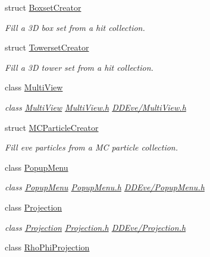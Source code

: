 \begin{DoxyCompactItemize}
struct \hyperlink{struct_d_d4hep_1_1_boxset_creator}{BoxsetCreator}
\begin{DoxyCompactList}\small\item\em Fill a 3D box set from a hit collection. \item\end{DoxyCompactList}\item 
struct \hyperlink{struct_d_d4hep_1_1_towerset_creator}{TowersetCreator}
\begin{DoxyCompactList}\small\item\em Fill a 3D tower set from a hit collection. \item\end{DoxyCompactList}\item 
class \hyperlink{class_d_d4hep_1_1_multi_view}{MultiView}
\begin{DoxyCompactList}\small\item\em class \hyperlink{class_d_d4hep_1_1_multi_view}{MultiView} \hyperlink{_multi_view_8h}{MultiView.h} \hyperlink{_multi_view_8h}{DDEve/MultiView.h} \item\end{DoxyCompactList}\item 
struct \hyperlink{struct_d_d4hep_1_1_m_c_particle_creator}{MCParticleCreator}
\begin{DoxyCompactList}\small\item\em Fill eve particles from a MC particle collection. \item\end{DoxyCompactList}\item 
class \hyperlink{class_d_d4hep_1_1_popup_menu}{PopupMenu}
\begin{DoxyCompactList}\small\item\em class \hyperlink{class_d_d4hep_1_1_popup_menu}{PopupMenu} \hyperlink{_popup_menu_8h}{PopupMenu.h} \hyperlink{_popup_menu_8h}{DDEve/PopupMenu.h} \item\end{DoxyCompactList}\item 
class \hyperlink{class_d_d4hep_1_1_projection}{Projection}
\begin{DoxyCompactList}\small\item\em class \hyperlink{class_d_d4hep_1_1_projection}{Projection} \hyperlink{_projection_8h}{Projection.h} \hyperlink{_projection_8h}{DDEve/Projection.h} \item\end{DoxyCompactList}\item 
class \hyperlink{class_d_d4hep_1_1_rho_phi_projection}{RhoPhiProjection}

\end{DoxyCompactItemize}
